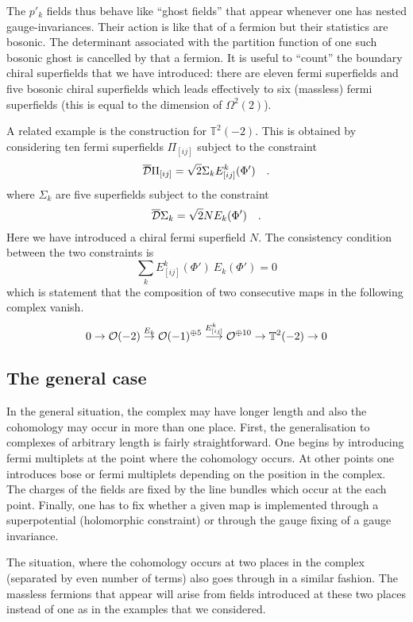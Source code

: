 \documentclass[a4paper,12pt]{article}
\def\Bbb{\mathbb}
\def\BT{\Bbb T}
\begin{document}
The $p'_k$ fields thus behave like ``ghost fields'' that appear whenever
one has nested gauge-invariances. Their action is like that of a fermion
but their statistics are bosonic. The determinant associated with
the partition function of one such bosonic ghost is cancelled by that
a fermion. 
It is useful to ``count'' the boundary chiral superfields that we have 
introduced:
there are eleven fermi superfields and five bosonic chiral superfields
which leads effectively to six (massless)
fermi superfields (this is equal to the dimension of $\Omega^2(2)$). 

A related example is the construction for $\BT^2(-2)$. This is obtained
by considering ten fermi superfields $\Pi_{[ij]}$ subject to the
constraint 
$$ 
\overline{\cal D} \Pi_{[ij]} = \sqrt2  \Sigma_k
E_{[ij]}^k(\Phi')\quad.
$$
where $\Sigma_k$ are five superfields subject to the constraint
$$
\overline{\cal D} \Sigma_k = \sqrt2 N E_k(\Phi') \quad.
$$
Here we have introduced a chiral fermi superfield $N$. The consistency
condition between the two constraints is
$$
\sum_k E_{[ij]}^k(\Phi')\  E_k(\Phi') =0
$$
which is statement that the composition of two consecutive maps in
the following complex vanish.
\begin{equation}
0\rightarrow {\cal O}(-2) \stackrel{E_k}{\rightarrow} {\cal O}(-1)^{\oplus5} 
\stackrel{E_{[ij]}^k}{\longrightarrow}
{\cal O}^{\oplus 10} \rightarrow \BT^2(-2)\rightarrow0
\end{equation}

\subsection{The general case}

In the general situation, the complex may have longer length and also
the cohomology may occur in more than one place. First, the generalisation
to complexes of arbitrary length is fairly straightforward. One begins by
introducing fermi multiplets at the point where the cohomology occurs. At
other points one introduces bose or fermi multiplets depending on the 
position in the complex. The charges of the fields are fixed by the line
bundles which occur at the each point. Finally, one has to fix whether
a given map is implemented through a superpotential (holomorphic
constraint) or through the gauge fixing of a gauge invariance. 

The situation, where  the cohomology occurs at two places in the complex
(separated by even number of terms) also goes through in a similar fashion.
The massless fermions that appear will arise from fields introduced at
these two places instead of one as in the examples that we considered.
\end{document}
